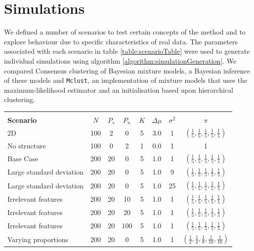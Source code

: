\documentclass[]{article}
\begin{document}
\section{Simulations} \label{sec:simulations}
We defined a number of scenarios to test certain concepts of the method and to explore behaviour due to specific characteristics of real data. The parameters associated with each scenario in table \ref{table:scenarioTable} were used to generate individual simulations using algorithm \ref{algorithm:simulationGeneration}. We compared Consensus clustering of Bayesian mixture models, a Bayesian inference of these models and \texttt{Mclust}, an implementation of mixture models that uses the maximum-likelihood estimator and an initialisation based upon hierarchical clustering.
\begin{table}[ht]
	\centering
	\begin{tabular}{l|ccccccc}
		\\[-1.8ex]\hline 
		\hline \\[-1.8ex] 
	\textbf{Scenario} & $N$ & $P_s$ & $P_n$ & $K$ & $\Delta\mu$ & $\sigma^2$ & $\pi$\\
	\hline 
	2D & 100 & 2 & 0 & 5 & 3.0 & 1 &  $(\frac{1}{5} , \frac{1}{5}, \frac{1}{5}, \frac{1}{5}, \frac{1}{5})$ \\
	No structure & 100 & 0 & 2 & 1 & 0.0 & 1 & 1 \\
	Base Case & 200 & 20 & 0 & 5 & 1.0 & 1 &  $(\frac{1}{5} , \frac{1}{5}, \frac{1}{5}, \frac{1}{5}, \frac{1}{5})$\\
	Large standard deviation & 200 & 20 & 0 & 5 & 1.0 & 9 & $(\frac{1}{5} , \frac{1}{5}, \frac{1}{5}, \frac{1}{5}, \frac{1}{5})$ \\
	Large standard deviation & 200 & 20 & 0 & 5 & 1.0 & 25 &  $(\frac{1}{5} , \frac{1}{5}, \frac{1}{5}, \frac{1}{5}, \frac{1}{5})$\\
	Irrelevant features & 200 & 20 & 10 & 5 & 1.0 & 1 &  $(\frac{1}{5} , \frac{1}{5}, \frac{1}{5}, \frac{1}{5}, \frac{1}{5})$\\
	Irrelevant features & 200 & 20 & 20 & 5 & 1.0 & 1 &  $(\frac{1}{5} , \frac{1}{5}, \frac{1}{5}, \frac{1}{5}, \frac{1}{5})$\\
	Irrelevant features & 200 & 20 & 100 & 5 & 1.0 & 1 &  $(\frac{1}{5} , \frac{1}{5}, \frac{1}{5}, \frac{1}{5}, \frac{1}{5})$\\
	Varying proportions & 200 & 20 & 0 & 5 & 1.0 & 1 & $(\frac{1}{2} , \frac{1}{4}, \frac{1}{8}, \frac{1}{16}, \frac{1}{16})$ \\

\end{tabular}
\end{table}
\end{document}
